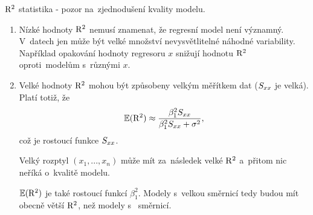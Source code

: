 \begin{remark}
	 $\mathrm{R}^2$ statistika - pozor na~zjednodušení kvality modelu. \begin{enumerate}
		\item Nízké hodnoty $\mathrm{R}^2$ nemusí znamenat, že regresní model není významný. V~datech jen může být velké množství nevysvětlitelné náhodné variability. Například opakování hodnoty regresoru $x$ snižují hodnotu $\mathrm{R}^2$ oproti~modelům s~různými $x$.
		\item Velké hodnoty $\mathrm{R}^2$ mohou být způsobeny velkým měřítkem dat ($S_{xx}$ je velká). Platí totiž, že
		 $$ \mathbb{E}(\mathrm{R}^2)\approx\frac{\beta_1^2 S_{xx}}{\beta_1^2 S_{xx}+\sigma^2}, $$ což je rostoucí funkce $S_{xx}$.
		
		Velký rozptyl $(x_1,...,x_n)$ může mít za~následek velké $\mathrm{R}^2$ a~přitom nic neříká o~kvalitě modelu.
		
		 $\mathbb{E}(\mathrm{R}^2)$ je také rostoucí funkcí $\beta_1^2$. Modely s~velkou směrnicí tedy budou mít obecně větší $\mathrm{R}^2$, než modely s~ směrnicí.
	\end{enumerate}
\end{remark}

